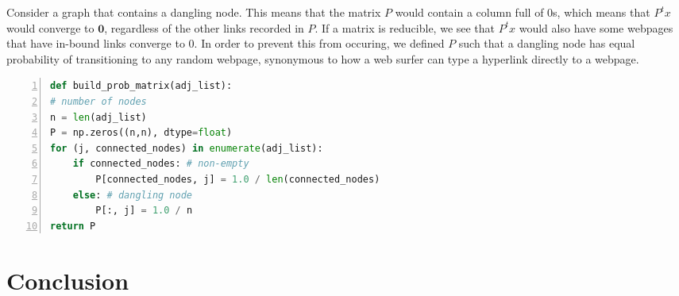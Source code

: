 \documentclass[11pt]{article}
\theoremstyle{definition}
\renewcommand{\vec}[1]{\mathbf{#1}}
\begin{document}
Consider a graph that contains a dangling node. This means that the matrix $P$ would contain a column full of 0s, which means that $P^tx$ would converge to $\vec{0}$, regardless of the other links recorded in $P$.
If a matrix is reducible, we see that $P^tx$ would also have some webpages that have in-bound links converge to 0.
In order to prevent this from occuring, we defined $P$ such that a dangling node has equal probability of transitioning to any random webpage, synonymous to how a web surfer can type a hyperlink directly to a webpage.

\begin{lstlisting}[language=python, basicstyle={\small\ttfamily}, numbers=left]
def build_prob_matrix(adj_list):
# number of nodes
n = len(adj_list)
P = np.zeros((n,n), dtype=float)
for (j, connected_nodes) in enumerate(adj_list):
    if connected_nodes: # non-empty
        P[connected_nodes, j] = 1.0 / len(connected_nodes)
    else: # dangling node
        P[:, j] = 1.0 / n
return P
\end{lstlisting}


\section{Conclusion}

\begin{thebibliography}{9}
\bibitem{}

\end{thebibliography}
\end{document}
